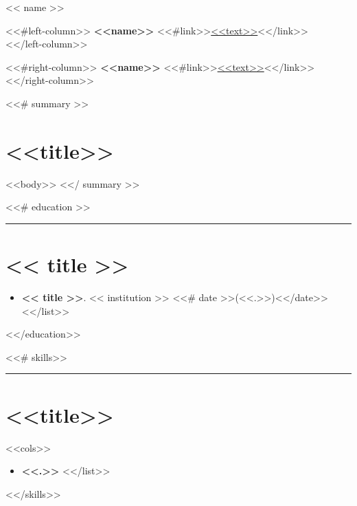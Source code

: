 \documentclass[<<fontsize>>]{article}
\providecommand{\tightlist}{%
  \setlength{\itemsep}{0pt}\setlength{\parskip}{0pt}}
\begin{document}
{\huge << name >>}

\bigskip

\begin{minipage}[t]{0.495\textwidth}
  <<#left-column>>
  \textbf{<<name>>} <<#link>>\href{<<to>>}{<<text>>}<</link>>\\
  <</left-column>>
\end{minipage} %
\begin{minipage}[t]{0.495\textwidth}
  <<#right-column>>
  \textbf{<<name>>} <<#link>>\href{<<to>>}{<<text>>}<</link>>\\
  <</right-column>>
\end{minipage}



<<# summary >>
\section{<<title>>}

<<body>>
<</ summary >>


<<# education >>
\begin{center}\rule{0.5\linewidth}{0.5pt}\end{center}
\section{<< title >>}

\begin{itemize}
  \tightlist
  <<# list >>
  \item \textbf{<< title >>}. << institution >> <<# date >>(<<.>>)<</date>>
  <</list>>
\end{itemize}
<</education>>


<<# skills>>
\begin{center}\rule{0.5\linewidth}{0.5pt}\end{center}
\section{<<title>>}

\begin{multicols}{<<cols>>}
  \begin{itemize}
    <<#list>>
    \item \textbf{<<.>>}
    <</list>>
  \end{itemize}
\end{multicols}
<</skills>>
\end{document}
